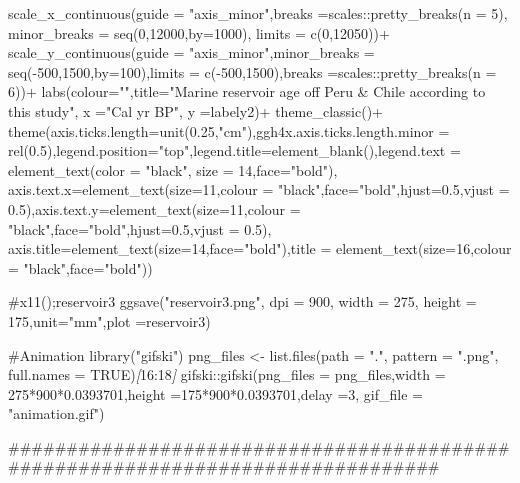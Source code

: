 \documentclass[
]{article}
\newenvironment{Shaded}{\begin{snugshade}}{\end{snugshade}}
\newcommand{\CommentTok}[1]{\textcolor[rgb]{0.56,0.35,0.01}{\textit{#1}}}
\newcommand{\NormalTok}[1]{#1}
\newcommand{\OtherTok}[1]{\textcolor[rgb]{0.56,0.35,0.01}{#1}}
\begin{document}
\begin{Shaded}
\begin{Highlighting}[]
\NormalTok{  scale\_x\_continuous(guide = "axis\_minor",breaks =scales::pretty\_breaks(n = 5),}
\NormalTok{                     minor\_breaks = seq(0,12000,by=1000),}
\NormalTok{                     limits = c(0,12050))+}
\NormalTok{  scale\_y\_continuous(guide = "axis\_minor",minor\_breaks = seq({-}500,1500,by=100),limits = c({-}500,1500),breaks =scales::pretty\_breaks(n = 6))+}
\NormalTok{  labs(colour="",title="Marine reservoir age off Peru \& Chile according to this study",}
\NormalTok{       x ="Cal yr BP", }
\NormalTok{       y =labely2)+}
\NormalTok{  theme\_classic()+}
\NormalTok{  theme(axis.ticks.length=unit(0.25,"cm"),ggh4x.axis.ticks.length.minor = rel(0.5),legend.position="top",legend.title=element\_blank(),legend.text = element\_text(color = "black", size = 14,face="bold"),}
\NormalTok{        axis.text.x=element\_text(size=11,colour = "black",face="bold",hjust=0.5,vjust = 0.5),axis.text.y=element\_text(size=11,colour = "black",face="bold",hjust=0.5,vjust = 0.5),}
\NormalTok{        axis.title=element\_text(size=14,face="bold"),title = element\_text(size=16,colour = "black",face="bold"))}

\NormalTok{\#x11();reservoir3}
\NormalTok{ggsave("reservoir3.png", dpi = 900,   width = 275,}
\NormalTok{       height = 175,unit="mm",plot =reservoir3)}

\NormalTok{\#Animation }
\NormalTok{library("gifski")}
\NormalTok{png\_files \textless{}{-} list.files(path = ".", pattern = ".png", full.names = TRUE)}\CommentTok{[}\OtherTok{16:18}\CommentTok{]}
\NormalTok{gifski::gifski(png\_files = png\_files,width = 275*900*0.0393701,height =175*900*0.0393701,delay =3, gif\_file = "animation.gif")}

\NormalTok{\#\#\#\#\#\#\#\#\#\#\#\#\#\#\#\#\#\#\#\#\#\#\#\#\#\#\#\#\#\#\#\#\#\#\#\#\#\#\#\#\#\#\#\#\#\#\#\#\#\#\#\#\#\#\#\#\#\#\#\#\#\#\#\#\#\#\#\#\#\#\#\#\#\#\#\#\#\#\#\#}
\end{Highlighting}
\end{Shaded}
\end{document}
